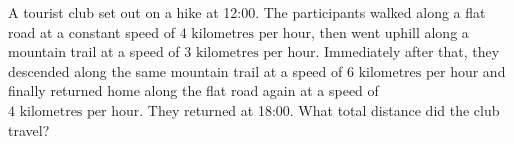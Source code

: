 A tourist club set out on a hike at 12:00. The participants walked along a flat road at a constant speed of $4\text{ kilometres per hour}$, then went uphill along a mountain trail at a speed of $3\text{ kilometres per hour}$. Immediately after that, they descended along the same mountain trail at a speed of $6\text{ kilometres per hour}$ and finally returned home along the flat road again at a speed of $4\text{ kilometres per hour}$. They returned at 18:00. What total distance did the club travel?
